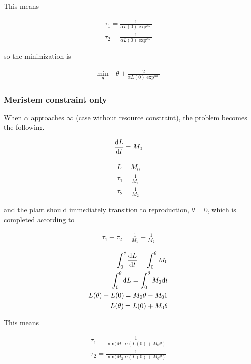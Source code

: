 \documentclass[12pt, oneside]{article}   	%
\begin{document}
This means

\begin{align}
\tau_1 = \frac{1}{\alpha L(0) \exp^{\alpha \theta}} \nonumber \\ 
\tau_2 = \frac{1}{\alpha L(0) \exp^{\alpha \theta}} \nonumber
\end{align}

so the minimization is 

\begin{align}
\min_{\theta} & \ \theta + \frac{2}{\alpha L(0) \exp^{\alpha \theta}}  \nonumber
\end{align}


\subsubsection{Meristem constraint only}
When $\alpha$ approaches $\infty$ (case without resource constraint), the problem becomes the following. 

\begin{align}
\dv{L}{t} = M_0
\end{align}

\begin{align}
\dot{L} =  M_0 \nonumber \\
\tau_1 = \frac{1}{M_1} \nonumber \\ 
\tau_2 = \frac{1}{M_2} \nonumber
\end{align}

and the plant should immediately transition to reproduction, $\theta=0$, which is completed according to

\begin{align}
\tau_1 + \tau_2 = \frac{1}{M_1} + \frac{1}{M_2}  \nonumber
\end{align}


\begin{align}
\int_{0}^{\theta} \dv{L}{t} =\int_{0}^{\theta} M_0 \nonumber \\
\int_{0}^{\theta} \mathrm{d}L =\int_{0}^{\theta} M_0 \mathrm{d}t \nonumber \\
L(\theta) - L(0) = M_0 \theta - M_0 0 \nonumber \\
L(\theta) = L(0) + M_0 \theta \nonumber 
\end{align}

This means

\begin{align}
\tau_1 =  \frac{1}{\mathrm{min}(M_1,\alpha (L(0) + M_0 \theta )} \nonumber \\ 
\tau_2 =  \frac{1}{\mathrm{min}(M_2,\alpha (L(0) + M_0 \theta )} \nonumber 
\end{align}
\end{document}
